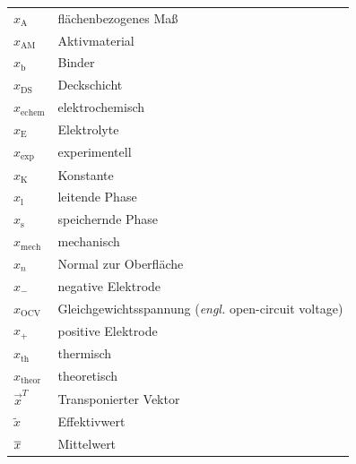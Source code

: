 {\begin{longtable}{@{}p{\TabulatorVZ}@{}p{\TabulatorTX+\TabulatorEH+2\tabcolsep}@{}}
	$x_{\text{A}}$				& flächenbezogenes Maß\\
	$x_{\text{AM}}$				& Aktivmaterial\\
	$x_{\text{b}}$				& Binder\\
	$x_{\text{DS}}$				& Deckschicht\\
	$x_{\text{echem}}$			& elektrochemisch\\
	$x_{\text{E}}$				& Elektrolyte\\
	$x_{\text{exp}}$			& experimentell\\
	$x_{\text{K}}$				& Konstante \\
	$x_{\text{l}}$				& leitende Phase\\
	$x_{\text{s}}$				& speichernde Phase\\
	$x_{\text{mech}}$			& mechanisch\\
	$x_n$						& Normal zur Oberfläche	\\
	$x_{-}$						& negative Elektrode \\
	$x_{\text{OCV}}$			& Gleichgewichtsspannung (\textit{engl.} open-circuit voltage) \\
	$x_{+}$						& positive Elektrode \\
	$x_{\text{th}}$				& thermisch \\
	$x_{\text{theor}}$			& theoretisch \\
	$\vec{x}^T$					& Transponierter Vektor	\\
	$\tilde{x}$				    & Effektivwert 	\\
	$\overline{x}$					& Mittelwert
\end{longtable}

} %


\clearpage